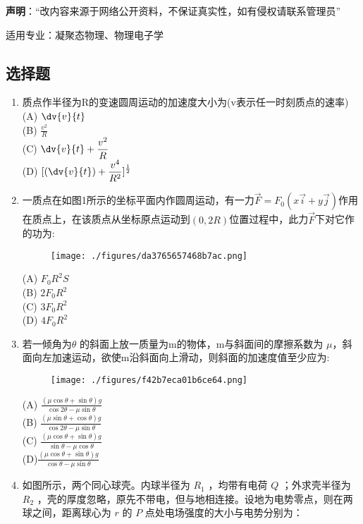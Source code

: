 
\textbf{声明}：“改内容来源于网络公开资料，不保证真实性，如有侵权请联系管理员”


适用专业：凝聚态物理、物理电子学
\subsection{选择题}
\begin{enumerate}
\item 质点作半径为R的变速圆周运动的加速度大小为(v表示任一时刻质点的速率)\\
(A) $\displaystyle \dv{v}{t}$\\
(B) $\displaystyle \frac{v^2}{R}$\\
(C) $\displaystyle \dv{v}{t}+\frac{v^2}{R}$\\
(D) $\displaystyle [(\dv{v}{t})+\frac{v^4}{R^2}]^\frac{1}{2}$
\item 一质点在如图1所示的坐标平面内作圆周运动，有一力$\vec F=F_0(x\vec i+y \vec j)$作用在质点上，在该质点从坐标原点运动到$(0,2R)$位置过程中，此力$\vec F$下对它作的功为:\\
\begin{figure}[ht]
\centering
\texttt{[image: ./figures/da3765657468b7ac.png]}
\caption{} \label{fig_BKDP06_13}
\end{figure}
(A) $F_0R^2S$\\
(B) $2F_0R^2$\\
(C) $3F_0R^2$\\
(D) $4F_0R^2$
\item 若一倾角为$\theta$ 的斜面上放一质量为m的物体，m与斜面间的摩擦系数为 $\mu$，斜面向左加速运动，欲使m沿斜面向上滑动，则斜面的加速度值至少应为:\\
\begin{figure}[ht]
\centering
\texttt{[image: ./figures/f42b7eca01b6ce64.png]}
\caption{} \label{fig_BKDP06_12}
\end{figure}
(A) $\displaystyle \frac{(\mu \cos \theta+\sin \theta)g}{\cos 2\theta -\mu \sin \theta}$\\
(B) $\displaystyle\frac{(\mu \sin \theta+\cos \theta)g}{\cos 2\theta -\mu \sin \theta}$\\
(C) $\displaystyle \frac{(\mu \cos \theta+\sin \theta)g}{\sin \theta -\mu \cos\theta}$\\
(D)$\displaystyle \frac{(\mu \cos \theta+\sin \theta)g}{\cos \theta -\mu \sin\theta}$
\item 如图所示，两个同心球壳。内球半径为 $R_1$ ，均带有电荷 $Q$ ；外求壳半径为 $R_2$ ，壳的厚度忽略，原先不带电，但与地相连接。设地为电势零点，则在两球之间，距离球心为 $r$ 的 $P$ 点处电场强度的大小与电势分别为：\\

\end{enumerate}
